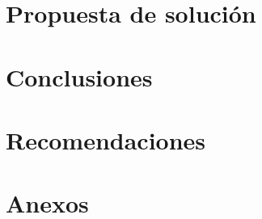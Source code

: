 \documentclass[letterpaper, oneside, openright, 12pt]{book}
\begin{document}
  \chapter{Propuesta de solución}
  
  \newpage %

  \chapter{Conclusiones}
  
  \newpage %

  \chapter{Recomendaciones}
  
  \newpage %

  \cleardoublepage
  \printbibliography

  \setcounter{section}{0} %
  \renewcommand{\thesection}{Anexo \arabic{section}}
  \chapter*{Anexos}
  
\end{document}
